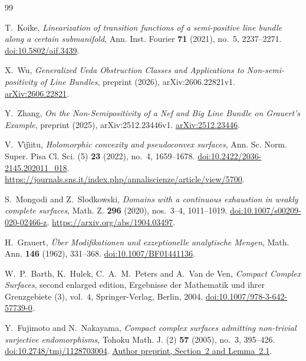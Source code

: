 \documentclass[11pt]{amsart}
\theoremstyle{definition}
\theoremstyle{remark}
\numberwithin{equation}{section}
\begin{document}
\begin{thebibliography}{99}
\raggedright

T.~Koike,
\emph{Linearization of transition functions of a semi-positive line
bundle along a certain submanifold},
Ann. Inst. Fourier \textbf{71} (2021), no.~5, 2237--2271.
\href{https://doi.org/10.5802/aif.3439}{doi:10.5802/aif.3439}.

X.~Wu,
\emph{Generalized Ueda Obstruction Classes and Applications to
Non-semi-positivity of Line Bundles},
preprint (2026), arXiv:2606.22821v1.
\href{https://arxiv.org/abs/2606.22821v1}{arXiv:2606.22821}.

Y.~Zhang,
\emph{On the Non-Semipositivity of a Nef and Big Line Bundle on
Grauert's Example},
preprint (2025), arXiv:2512.23446v1.
\href{https://arxiv.org/abs/2512.23446v1}{arXiv:2512.23446}.

V.~V\^{\i}j\^{\i}itu,
\emph{Holomorphic convexity and pseudoconvex surfaces},
Ann. Sc. Norm. Super. Pisa Cl. Sci. (5) \textbf{23} (2022),
no.~4, 1659--1678.
\href{https://doi.org/10.2422/2036-2145.202011_018}{doi:10.2422/2036-2145.202011\_018}.
\url{https://journals.sns.it/index.php/annaliscienze/article/view/5700}.

S.~Mongodi and Z.~Slodkowski,
\emph{Domains with a continuous exhaustion in weakly complete surfaces},
Math. Z. \textbf{296} (2020), nos.~3--4, 1011--1019.
\href{https://doi.org/10.1007/s00209-020-02466-z}{doi:10.1007/s00209-020-02466-z}.
\url{https://arxiv.org/abs/1904.03497}.

H.~Grauert,
\emph{\"Uber Modifikationen und exzeptionelle analytische Mengen},
Math. Ann. \textbf{146} (1962), 331--368.
\href{https://doi.org/10.1007/BF01441136}{doi:10.1007/BF01441136}.

W.~P.~Barth, K.~Hulek, C.~A.~M.~Peters and A.~Van de Ven,
\emph{Compact Complex Surfaces}, second enlarged edition,
Ergebnisse der Mathematik und ihrer Grenzgebiete (3), vol.~4,
Springer-Verlag, Berlin, 2004.
\href{https://doi.org/10.1007/978-3-642-57739-0}{doi:10.1007/978-3-642-57739-0}.

Y.~Fujimoto and N.~Nakayama,
\emph{Compact complex surfaces admitting non-trivial surjective endomorphisms},
Tohoku Math. J. (2) \textbf{57} (2005), no.~3, 395--426.
\href{https://doi.org/10.2748/tmj/1128703004}{doi:10.2748/tmj/1128703004}.
\href{https://www.kurims.kyoto-u.ac.jp/preprint/file/RIMS1431.pdf}{Author preprint, Section~2 and Lemma~2.1}.


\end{thebibliography}
\end{document}
